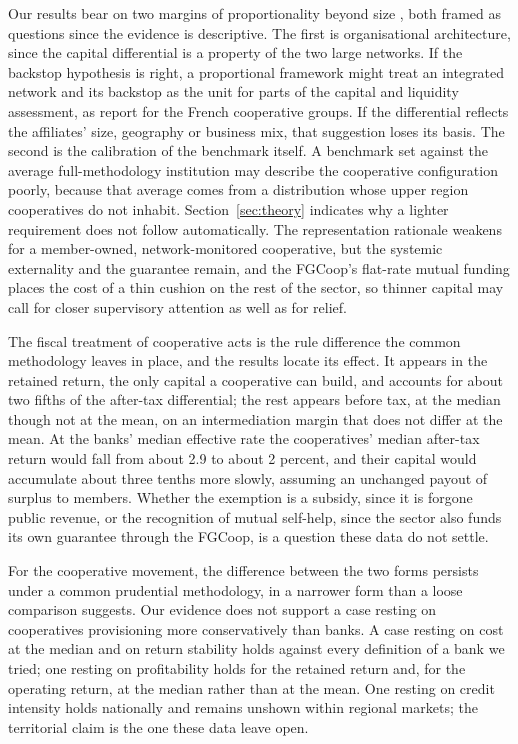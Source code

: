 \documentclass[11pt,a4paper]{article}
\begin{document}
Our results bear on two margins of proportionality beyond size \citep{cmn4553}, both
framed as questions since the evidence is descriptive. The first is organisational
architecture, since the capital differential is a property of the two large networks.
If the backstop hypothesis is right, a proportional framework might treat
an integrated network and its backstop as the unit for parts of the capital and
liquidity assessment, as \citet{coelho2019} report for the French cooperative groups. If
the differential
reflects the affiliates' size, geography or business mix, that suggestion loses its
basis. The second is the calibration of the benchmark itself. A benchmark set against
the average full-methodology institution may describe the cooperative configuration
poorly, because that average comes from a distribution whose upper region cooperatives do
not inhabit. Section~\ref{sec:theory} indicates why a lighter requirement does not follow
automatically. The representation rationale weakens for a member-owned, network-monitored
cooperative, but the systemic externality and the guarantee remain, and the FGCoop's
flat-rate mutual funding places the cost of a thin cushion on the rest of the sector, so
thinner capital may call for closer supervisory attention as well as for relief.

The fiscal treatment of cooperative acts is the rule difference the common methodology
leaves in place, and the results locate its effect. It appears in the retained return,
the only capital a cooperative can build, and accounts for about two fifths of the
after-tax differential; the rest appears before tax, at the median though not at the
mean, on an intermediation margin that does not differ at the mean. At the banks' median effective rate the cooperatives' median
after-tax return would fall from about 2.9 to about 2 percent, and their capital would
accumulate about three tenths more slowly, assuming an unchanged payout of surplus to
members. Whether the exemption is a subsidy, since it is forgone public revenue, or the
recognition of mutual self-help, since the sector also funds its own guarantee through
the FGCoop, is a question these data do not settle.

For the cooperative movement, the difference between the two forms persists under a
common prudential methodology, in a narrower form than a loose comparison suggests. Our
evidence does not support a case resting on cooperatives provisioning more conservatively
than banks. A case resting on cost at the median and on return stability holds against
every definition of a bank we tried; one resting on profitability holds for the retained
return and, for the operating return, at the median rather than at the mean. One resting on credit intensity holds nationally and remains unshown within regional
markets; the territorial claim is the one these data leave open.
\end{document}
